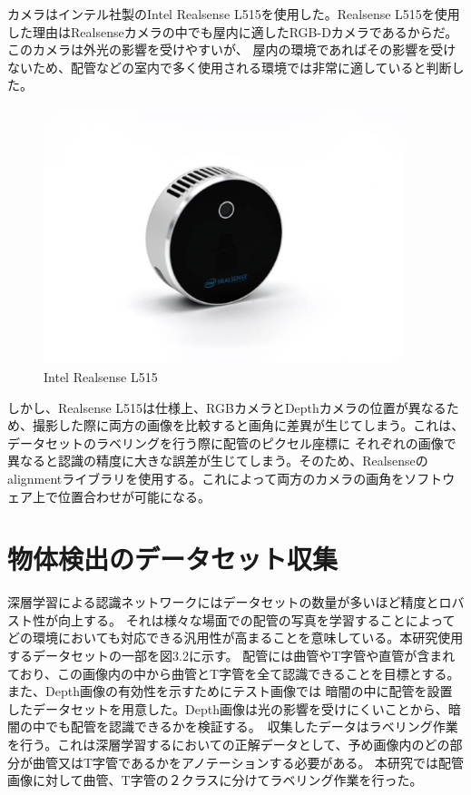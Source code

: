 カメラはインテル社製のIntel Realsense L515を使用した。Realsense L515を使用した理由はRealsenseカメラの中でも屋内に適したRGB-Dカメラであるからだ。このカメラは外光の影響を受けやすいが、
屋内の環境であればその影響を受けないため、配管などの室内で多く使用される環境では非常に適していると判断した。
\begin{figure}[htbt]
    \centering
     \includegraphics[height=75mm]{realsense.eps}
     \caption{Intel Realsense L515}
     \label{fig:f2}
\end{figure}

しかし、Realsense L515は仕様上、RGBカメラとDepthカメラの位置が異なるため、撮影した際に両方の画像を比較すると画角に差異が生じてしまう。これは、データセットのラベリングを行う際に配管のピクセル座標に
それぞれの画像で異なると認識の精度に大きな誤差が生じてしまう。そのため、Realsenseのalignmentライブラリを使用する。これによって両方のカメラの画角をソフトウェア上で位置合わせが可能になる。

\section{物体検出のデータセット収集}
深層学習による認識ネットワークにはデータセットの数量が多いほど精度とロバスト性が向上する。
それは様々な場面での配管の写真を学習することによってどの環境においても対応できる汎用性が高まることを意味している。本研究使用するデータセットの一部を図3.2に示す。
配管には曲管やT字管や直管が含まれており、この画像内の中から曲管とT字管を全て認識できることを目標とする。また、Depth画像の有効性を示すためにテスト画像では
暗闇の中に配管を設置したデータセットを用意した。Depth画像は光の影響を受けにくいことから、暗闇の中でも配管を認識できるかを検証する。\
収集したデータはラベリング作業を行う。これは深層学習するにおいての正解データとして、予め画像内のどの部分が曲管又はT字管であるかをアノテーションする必要がある。
本研究では配管画像に対して曲管、T字管の２クラスに分けてラベリング作業を行った。

